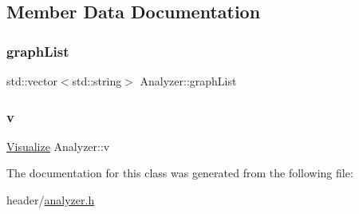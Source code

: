 \subsection{Member Data Documentation}
\mbox{\label{class_analyzer_a567b5d8b2bbdde28b489834c1644446e}} 
\subsubsection{\texorpdfstring{graph\+List}{graphList}}
{\footnotesize\ttfamily std\+::vector$<$std\+::string$>$ Analyzer\+::graph\+List}

\mbox{\label{class_analyzer_ae32079d0816589617a0c76b1d4cf881b}} 
\subsubsection{\texorpdfstring{v}{v}}
{\footnotesize\ttfamily \hyperlink{class_visualize}{Visualize} Analyzer\+::v}



The documentation for this class was generated from the following file\+:\begin{DoxyCompactItemize}
\item 
header/\hyperlink{analyzer_8h}{analyzer.\+h}\end{DoxyCompactItemize}
